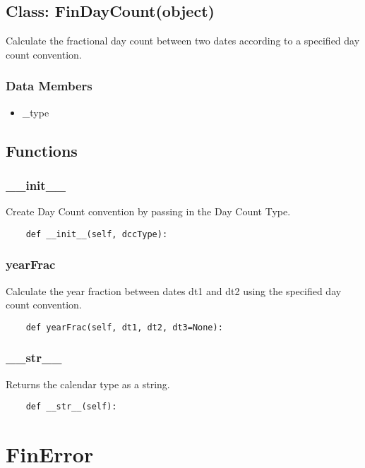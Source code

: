 \documentclass[twoside,11pt]{book}
\begin{document}
\subsection*{Class: FinDayCount(object)}
Calculate the fractional day count between two dates according to a specified day count convention.  

\subsubsection*{Data Members}
\begin{itemize}
\item{\_type}
\end{itemize}

\subsection*{Functions}

\subsubsection*{{\bf \_\_init\_\_}}
Create Day Count convention by passing in the Day Count Type.  

\begin{lstlisting}
    def __init__(self, dccType):
\end{lstlisting}

\subsubsection*{{\bf yearFrac}}
Calculate the year fraction between dates dt1 and dt2 using the specified day count convention.  

\begin{lstlisting}
    def yearFrac(self, dt1, dt2, dt3=None):
\end{lstlisting}

\subsubsection*{{\bf \_\_str\_\_}}
Returns the calendar type as a string.  

\begin{lstlisting}
    def __str__(self):
\end{lstlisting}

\newpage
\section{FinError}
\end{document}
